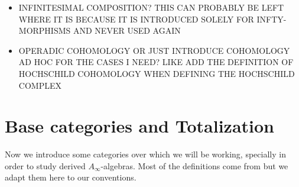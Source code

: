\documentclass[Thesis.tex]{subfiles}
\begin{document}
\begin{itemize}






\item INFINITESIMAL COMPOSITION? THIS CAN PROBABLY BE LEFT WHERE IT IS BECAUSE IT IS INTRODUCED SOLELY FOR INFTY-MORPHISMS AND NEVER USED AGAIN




\item OPERADIC COHOMOLOGY OR JUST INTRODUCE COHOMOLOGY AD HOC FOR THE CASES I NEED? LIKE ADD THE DEFINITION OF HOCHSCHILD COHOMOLOGY WHEN DEFINING THE HOCHSCHILD COMPLEX

\end{itemize}
\section{Base categories and Totalization}\label{categories}

Now we introduce some categories over which we will be working, specially in order to study derived $A_\infty$-algebras. 
Most of the definitions come from \cite[\S 2]{whitehouse} but we adapt them here to our conventions.
\end{document}
